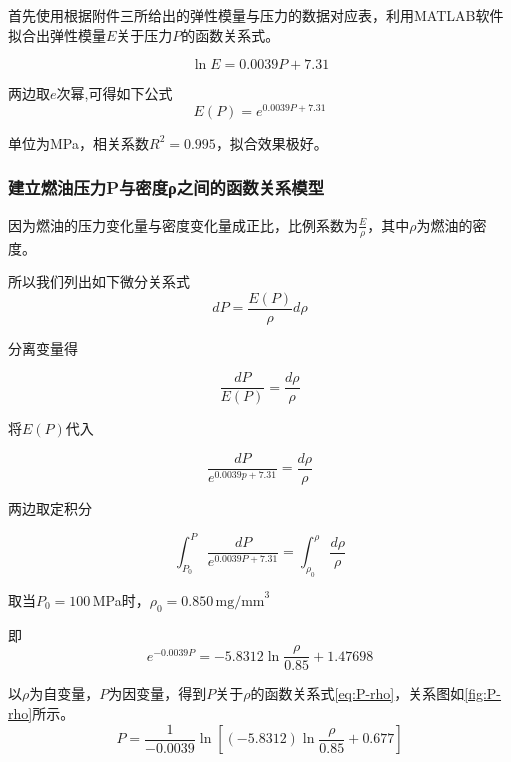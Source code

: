 \documentclass[withoutpreface,bwprint]{cumcmthesis} %
\begin{document}
首先使用根据附件三所给出的弹性模量与压力的数据对应表，利用MATLAB软件拟合出弹性模量$E$关于压力$P$的函数关系式。

\begin{equation}
\ln E=0.0039P+7.31
\label{eq:E-P}
\end{equation}

两边取$e$次幂,可得如下公式
\begin{equation}
E(P)=e^{0.0039P+7.31}
\label{eq:2}
\end{equation}

单位为MPa，相关系数$R^{2}=0.995$，拟合效果极好。
\subsubsection{建立燃油压力P与密度ρ之间的函数关系模型}

因为燃油的压力变化量与密度变化量成正比，比例系数为$\frac{E}{\rho}$，其中$\rho$为燃油的密度。

所以我们列出如下微分关系式
\begin{equation}
dP= \frac{E(P)}{\rho}d\rho
\end{equation}

分离变量得

\begin{equation}
\frac{dP}{E(P)}=\frac{d\rho}{\rho}
\end{equation}

将$E(P)$代入

\begin{equation}
\frac{dP}{e^{0.0039p+7.31}}=\frac{d\rho}{\rho}
\end{equation}

两边取定积分

\begin{equation*}
\int_{P_{0}}^{P}\  \frac{dP}{e^{0.0039P+7.31}} = \int_{\rho_{0}}^{\rho}\ \frac{d\rho}{\rho}
\end{equation*}

取当$P_0=100\,$MPa时，$\rho_0=0.850\,\text{mg/mm}^{3}$

即
\begin{equation}
e^{-0.0039P}=-5.8312\ln{\frac{\rho}{0.85}} +1.47698
\end{equation}

以$\rho$为自变量，$P$为因变量，得到$P$关于$\rho$的函数关系式\cref{eq:P-rho}，关系图如\cref{fig:P-rho}所示。
\begin{equation}
P=\frac{1}{-0.0039}\ln{\left[(-5.8312)\ln\frac{\rho}{0.85}+0.677\right]}  
\label{eq:P-rho}
\end{equation}
\end{document}
